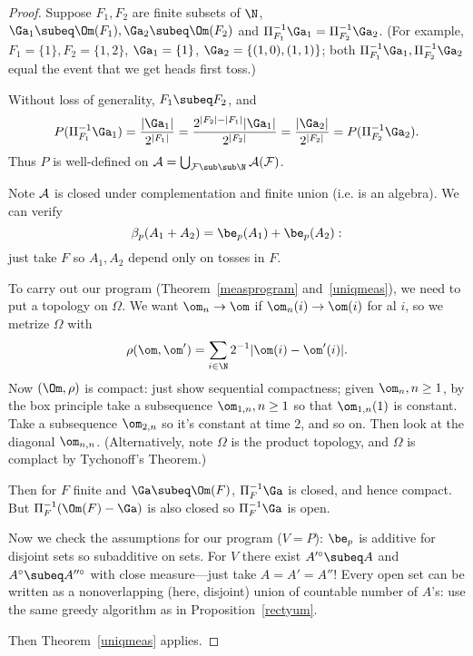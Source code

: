 \begin{proof}
Suppose $F_1,F_2$ are finite subsets of $\N$, $\Ga_1\subeq \Om(F_1), \Ga_2\subeq \Om(F_2)$ and $\Pi_{F_1}^{-1}\Ga_1=\Pi_{F_2}^{-1}\Ga_2$. (For example, $F_1=\{1\},F_2=\{1,2\}$, $\Ga_1=\{1\}$, $\Ga_2=\{(1,0),(1,1)\}$; both $\Pi_{F_1}^{-1}\Ga_1,\Pi_{F_2}^{-1}\Ga_2$ equal the event that we get heads first toss.)

Without loss of generality, $F_1\subeq F_2$, and
\[
P(\Pi_{F_1}^{-1}\Ga_1)=\frac{|\Ga_1|}{2^{|F_1|}}
=\frac{2^{|F_2|-|F_1|}|\Ga_1|}{2^{|F_2|}}
=\frac{|\Ga_2|}{2^{|F_2|}}
=P(\Pi_{F_2}^{-1}\Ga_2).
\]
Thus $P$ is well-defined on $\cal A=\bigcup_{F\sub\sub \N} \cal A(F)$.

Note $\cal A$ is closed under complementation and finite union (i.e. is an algebra). We can verify
\[
\beta_{p}(A_1+A_2)=\be_{p}(A_1)+\be_p(A_2):
\]
just take $F$ so $A_1,A_2$ depend only on tosses in $F$.

To carry out our program (Theorem~\ref{measprogram} and~\ref{uniqmeas}),
we need to put a topology on $\Omega$. We want $\om_n\to \om$ if $\om_n(i)\to \om(i)$ for al $i$, so we metrize $\Omega$ with
\[
\rho(\om,\om')=\sum_{i\in \N} 2^{-1}|\om(i)-\om'(i)|.
\]
Now $(\Om,\rho)$ is compact: just show sequential compactness; given $\om_n,n\geq 1$, by the box principle take a subsequence $\om_{1,n},n\geq 1$ so that $\om_{1,n}(1)$ is constant. Take a subsequence $\om_{2,n}$ so it's constant at time 2, and so on. Then look at the diagonal $\om_{n,n}$.
(Alternatively, note $\Omega$ is the product topology, and $\Omega$ is complact by Tychonoff's Theorem.)

Then for $F$ finite and $\Ga\subeq \Om(F)$, $\Pi_F^{-1}\Ga$ is closed, and hence compact. %
But $\Pi_F^{-1}(\Om(F)-\Ga)$ is also closed so $\Pi_F^{-1}\Ga$ is open.

Now we check the assumptions for our program ($V=P$): $\be_p$ is additive for disjoint sets so subadditive on sets. For $V$ there exist $A'^{\circ}\subeq A$ and $A^{\circ}\subeq A''^{\circ}$ with close measure---just take $A=A'=A''$! Every open set can be written as a nonoverlapping (here, disjoint) union of countable number of $A$'s: use the same greedy algorithm as in Proposition~\ref{rectyum}.

Then Theorem~\ref{uniqmeas} applies.
\end{proof}


